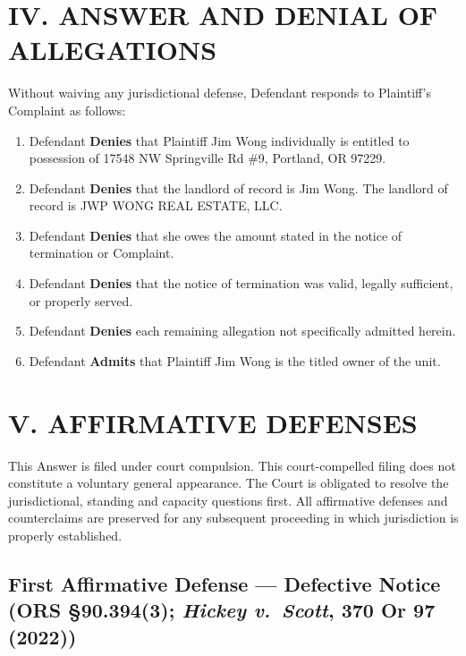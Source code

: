 \documentclass[12pt,letterpaper]{article}
\begin{document}
\section*{IV. ANSWER AND DENIAL OF ALLEGATIONS}

Without waiving any jurisdictional defense, Defendant responds to Plaintiff's Complaint as follows:

\begin{enumerate}
  \item Defendant \textbf{Denies} that Plaintiff Jim Wong individually is entitled to possession of 17548 NW Springville Rd \#9, Portland, OR 97229.
  \item Defendant \textbf{Denies} that the landlord of record is Jim Wong. The landlord of record is JWP WONG REAL ESTATE, LLC.
  \item Defendant \textbf{Denies} that she owes the amount stated in the notice of termination or Complaint.
  \item Defendant \textbf{Denies} that the notice of termination was valid, legally sufficient, or properly served.
  \item Defendant \textbf{Denies} each remaining allegation not specifically admitted herein.
  \item Defendant \textbf{Admits} that Plaintiff Jim Wong is the titled owner of the unit.
\end{enumerate}

\section*{V. AFFIRMATIVE DEFENSES}

This Answer is filed under court compulsion. This court-compelled filing does not constitute a voluntary general appearance. The Court is obligated to resolve the jurisdictional, standing and capacity questions first. All affirmative defenses and counterclaims are preserved for any subsequent proceeding in which jurisdiction is properly established.

\subsection{First Affirmative Defense --- Defective Notice (ORS \S90.394(3); \textit{Hickey v.\ Scott}, 370 Or 97 (2022))}
\end{document}
